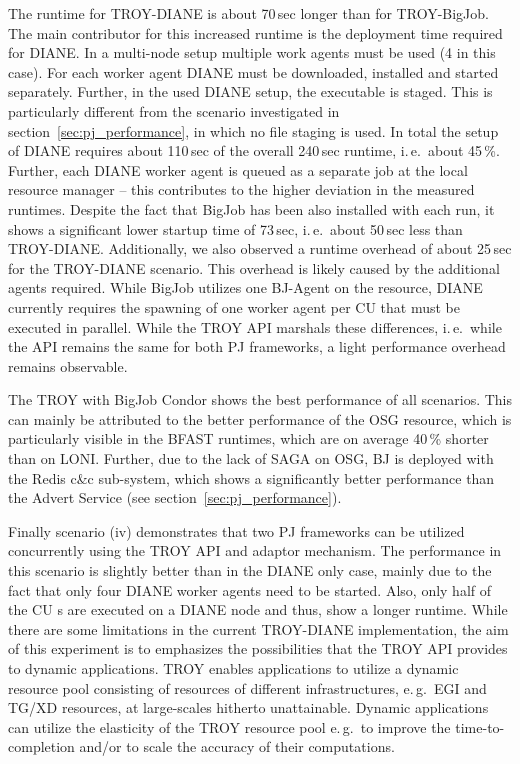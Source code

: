\documentclass[conference,final]{IEEEtran}
\newcommand{\jhanote}[1]{ {\textcolor{red} { ***shantenu: #1 }}}
\newcommand{\alnote}[1]{ {\textcolor{blue} { ***andre: #1 }}}
\newcommand{\alnote}[1]{}
\newcommand{\jhanote}[1]{}
\newcommand{\cu}{CU\xspace}
\begin{document}
The runtime for TROY-DIANE is about 70\,sec longer than for TROY-BigJob. The 
main contributor for this increased runtime is the deployment time required for
DIANE. In a multi-node setup multiple work agents must be used (4 in this case).
For each worker agent DIANE must be downloaded, installed and started
separately. Further, in the used DIANE setup, the executable is staged. This is
particularly different from the scenario investigated in
section~\ref{sec:pj_performance}, in which no file staging is used. In total the
setup of DIANE requires about 110\,sec of the overall 240\,sec runtime, i.\,e.\
about 45\,\%. Further, each DIANE worker agent is queued as a separate job at
the local resource manager -- this contributes to the higher deviation in the
measured runtimes. Despite the fact that BigJob has been also installed with
each run, it shows a significant lower startup time of 73\,sec, i.\,e.\ about
50\,sec less than TROY-DIANE. Additionally, we also observed a runtime overhead
of about 25\,sec for the TROY-DIANE scenario. This overhead is likely caused by
the additional agents required. While BigJob utilizes one BJ-Agent on the 
resource, DIANE currently requires the spawning of one worker agent per \cu  that 
must be executed in parallel. While the TROY API marshals these differences, 
i.\,e.\ while the API remains the same for both PJ frameworks, a light 
performance overhead remains observable.

The TROY with BigJob Condor shows the best performance of all scenarios. This
can mainly be attributed to the better performance of the OSG resource, which is
particularly visible in the BFAST runtimes, which are on average 40\,\% shorter
than on LONI. Further, due to the lack of SAGA on OSG, BJ is deployed with the
Redis c\&c sub-system, which shows a significantly better performance than the
Advert Service (see section~\ref{sec:pj_performance}).


Finally scenario (iv) demonstrates that two PJ frameworks can be
utilized concurrently using the TROY API and adaptor mechanism. The
performance in this scenario is slightly better than in the DIANE only
case, mainly due to the fact that only four DIANE worker agents need
to be started. Also, only half of the \cu s are executed on a DIANE node
and thus, show a longer runtime. While there are some limitations in
the current TROY-DIANE implementation, the aim of this experiment is
to emphasizes the possibilities that the TROY API provides to dynamic
applications. TROY enables applications to utilize a dynamic resource
pool consisting of resources of different infrastructures, e.\,g.\ EGI
and TG/XD resources, at large-scales hitherto unattainable. Dynamic
applications can utilize the elasticity of the TROY resource pool
e.\,g.\ to improve the time-to-completion and/or to scale the accuracy
of their computations.
\end{document}
